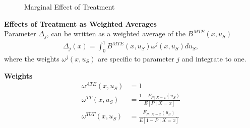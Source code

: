 \begin{frame}
\begin{figure}[htp]\centering
	\caption{Marginal Effect of Treatment}\label{Marginal Effect of Heterogeneity}
\end{figure}
\end{frame}


\begin{frame}
\textbf{Effects of Treatment as Weighted Averages} \\ \vspace{15pt}
Parameter \(\Delta_j\), can be written as a weighted average of the
\(B^{MTE}(x, u_S)\)
\begin{align*}
\Delta_j(x) = \int_0^1 B^{MTE}(x, u_S) \omega^j(x, u_S) du_S,
\end{align*}
where the weights \(\omega^j(x, u_S)\) are specific to parameter \(j\)
and integrate to one.
\end{frame}


\begin{frame}
\textbf{Weights}
\begin{align*}
 \omega^{ATE}(x, u_S) & = 1 \\
 \omega^{TT}(x, u_S) & = \frac{1 - F_{P\mid X=x}(u_S)}{E[P \mid X = x]}\\
 \omega^{TUT}(x, u_S) & = \frac{F_{P\mid X=x}(u_S)}{E[1 - P \mid X = x]}
\end{align*}
\end{frame}


